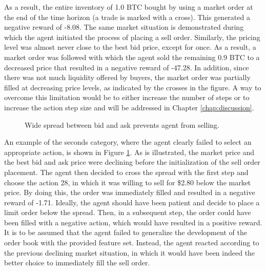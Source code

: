 As a result, the entire inventory of 1.0 BTC bought by using a market order at the end of the time horizon (a trade is marked with a cross).
This generated a negative reward of -8.08.
The same market situation is demonstrated during which the agent initiated the process of placing a sell order.
Similarly, the pricing level was almost never close to the best bid price, except for once.
As a result, a market order was followed with which the agent sold the remaining 0.9 BTC to a decreased price that resulted in a negative reward of -47.28.
In addition, since there was not much liquidity offered by buyers, the market order was partially filled at decreasing price levels, as indicated by the crosses in the figure.
A way to overcome this limitation would be to either increase the number of steps or to increase the action step size and will be addressed in Chapter \ref{chap:discussion}.
\begin{figure}[H]
    \centering
    \caption{Wide spread between bid and ask prevents agent from selling.}
    \label{fig:analysis-limit-impatient}
\end{figure}
An example of the seconds category, where the agent clearly failed to select an appropriate action, is shown in Figure \ref{fig:analysis-limit-impatient}.
As is illustrated, the market price and the best bid and ask price were declining before the initialization of the sell order placement. 
The agent then decided to cross the spread with the first step and choose the action 28, in which it was willing to sell for \$2.80 below the market price.
By doing this, the order was immediately filled and resulted in a negative reward of -1.71.
Ideally, the agent should have been patient and decide to place a limit order below the spread.
Then, in a subsequent step, the order could have been filled with a negative action, which would have resulted in a positive reward.
It is to be assumed that the agent failed to generalize the development of the order book with the provided feature set.
Instead, the agent reacted according to the previous declining market situation, in which it would have been indeed the better choice to immediately fill the sell order.

